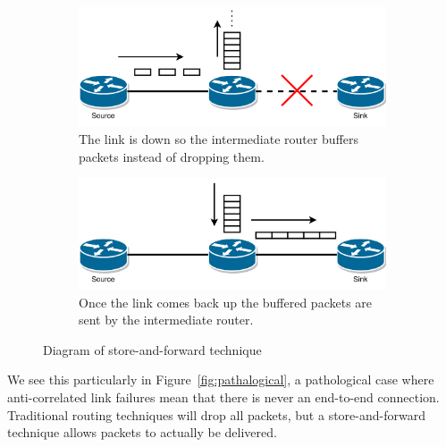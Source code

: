 \documentclass[withindex,glossary,openany]{cam-thesis}
\begin{document}
\begin{figure}[H]
\centering
\begin{subfigure}{.65\textwidth}
  \centering
  \includegraphics[width=1\linewidth]{storeandforward_down}
  \caption{The link is down so the intermediate router buffers packets instead of dropping them.}
  \label{fig:saf_down}
\end{subfigure}
\begin{subfigure}{.65\textwidth}
  \centering
  \includegraphics[width=1\linewidth]{storeandforward_up}
  \caption{Once the link comes back up the buffered packets are sent by the intermediate router.}
  \label{fig:saf_up}
\end{subfigure}
\caption{Diagram of store-and-forward technique}
\label{fig:saf}
\end{figure}

We see this particularly in Figure~\ref{fig:pathalogical}, a pathological case where anti-correlated link failures mean that there is never an end-to-end connection. Traditional routing techniques will drop all packets, but a store-and-forward technique allows packets to actually be delivered.
\end{document}
